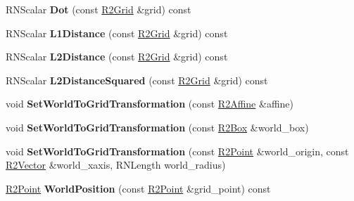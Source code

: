 \begin{DoxyCompactItemize}
\item 
R\+N\+Scalar {\bfseries Dot} (const \hyperlink{class_r2_grid}{R2\+Grid} \&grid) const \hypertarget{class_r2_grid_ab591a6c563ce99cde5bc56f0860ab1b6}{}\label{class_r2_grid_ab591a6c563ce99cde5bc56f0860ab1b6}

\item 
R\+N\+Scalar {\bfseries L1\+Distance} (const \hyperlink{class_r2_grid}{R2\+Grid} \&grid) const \hypertarget{class_r2_grid_a4c5e1ad6c45d7060f84f631c6b423c08}{}\label{class_r2_grid_a4c5e1ad6c45d7060f84f631c6b423c08}

\item 
R\+N\+Scalar {\bfseries L2\+Distance} (const \hyperlink{class_r2_grid}{R2\+Grid} \&grid) const \hypertarget{class_r2_grid_a262d42b110a9309fb72c6767f577cc7b}{}\label{class_r2_grid_a262d42b110a9309fb72c6767f577cc7b}

\item 
R\+N\+Scalar {\bfseries L2\+Distance\+Squared} (const \hyperlink{class_r2_grid}{R2\+Grid} \&grid) const \hypertarget{class_r2_grid_aff7cf5a83223b64ecc20e4ee2db0ba36}{}\label{class_r2_grid_aff7cf5a83223b64ecc20e4ee2db0ba36}

\item 
void {\bfseries Set\+World\+To\+Grid\+Transformation} (const \hyperlink{class_r2_affine}{R2\+Affine} \&affine)\hypertarget{class_r2_grid_a63087fcd7d32ffd8e8100b83af1ea134}{}\label{class_r2_grid_a63087fcd7d32ffd8e8100b83af1ea134}

\item 
void {\bfseries Set\+World\+To\+Grid\+Transformation} (const \hyperlink{class_r2_box}{R2\+Box} \&world\+\_\+box)\hypertarget{class_r2_grid_a4807b1c3a374aad3f64b6fd0442e6988}{}\label{class_r2_grid_a4807b1c3a374aad3f64b6fd0442e6988}

\item 
void {\bfseries Set\+World\+To\+Grid\+Transformation} (const \hyperlink{class_r2_point}{R2\+Point} \&world\+\_\+origin, const \hyperlink{class_r2_vector}{R2\+Vector} \&world\+\_\+xaxis, R\+N\+Length world\+\_\+radius)\hypertarget{class_r2_grid_a29c78ad5581c88f5e36556bfe58e5c5c}{}\label{class_r2_grid_a29c78ad5581c88f5e36556bfe58e5c5c}

\item 
\hyperlink{class_r2_point}{R2\+Point} {\bfseries World\+Position} (const \hyperlink{class_r2_point}{R2\+Point} \&grid\+\_\+point) const \hypertarget{class_r2_grid_af2466da8df11d5a4639350c4c91303f7}{}\label{class_r2_grid_af2466da8df11d5a4639350c4c91303f7}


\end{DoxyCompactItemize}
